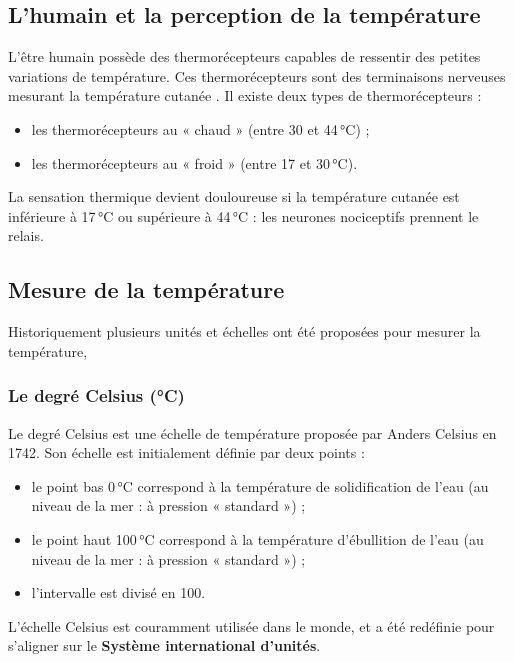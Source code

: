 \subsection*{L'humain et la perception de la température}
L'être humain possède des thermorécepteurs capables de ressentir des petites variations de température. Ces thermorécepteurs sont des terminaisons nerveuses mesurant la température cutanée .
Il existe deux types de thermorécepteurs :
\begin{itemize}
  \item les thermorécepteurs au « chaud » (entre 30 et 44\,°C) ;
  \item les thermorécepteurs au « froid » (entre 17 et 30\,°C).
\end{itemize}
La sensation thermique devient douloureuse si la température cutanée est inférieure à 17\,°C ou supérieure à 44\,°C : les neurones nociceptifs prennent le relais.

\subsection*{Mesure de la température}
Historiquement plusieurs unités et échelles ont été proposées pour mesurer la température,

\subsubsection*{Le degré Celsius (°C)}
Le degré Celsius est une échelle de température proposée par Anders Celsius en 1742. Son échelle est initialement définie par deux points :
  \begin{itemize}
    \item le point bas 0\,°C correspond à la température de solidification de l'eau (au niveau de la mer : à pression « standard ») ;
    \item le point haut 100\,°C correspond à la température d'ébullition de l'eau (au niveau de la mer : à pression « standard ») ;
    \item l'intervalle est divisé en 100.
  \end{itemize}

L'échelle Celsius est couramment utilisée dans le monde, et a été redéfinie pour s'aligner sur le \textbf{Système international d'unités}.
  

